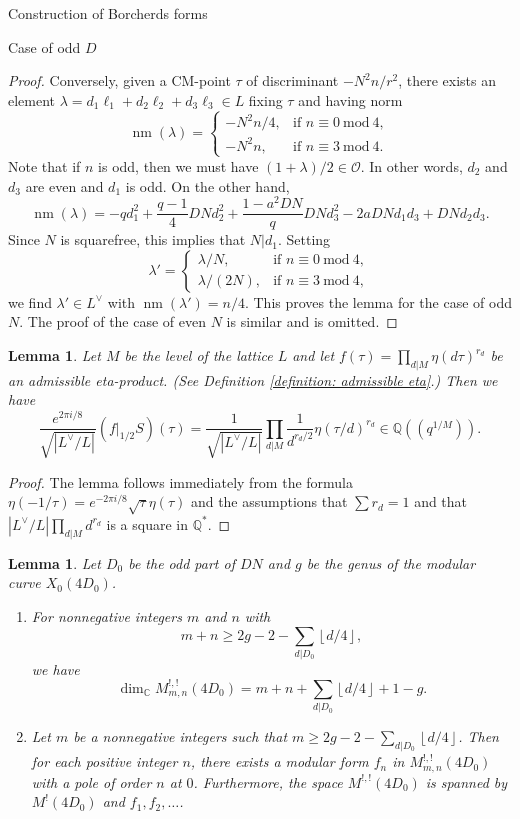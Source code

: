 \documentclass{amsart}
\newcounter{lemma}
\newtheorem{Lemma}[lemma]{Lemma}
\theoremstyle{definition}
\def\nm{\operatorname{nm}}
\def\C{\mathbb C}
\def\O{\mathcal O}
\def\Q{\mathbb Q}
\def\mod{\  \mathrm{mod}\ }
\def\gauss#1{\left\lfloor #1\right\rfloor}
\begin{document}
\begin{section}{Construction of Borcherds forms}
\begin{subsection}{Case of odd $D$}
\begin{proof}
  Conversely, given a CM-point $\tau$ of discriminant $-N^2n/r^2$,
  there exists an element $\lambda=d_1\ell_1+d_2\ell_2+d_3\ell_3\in L$
  fixing $\tau$ and having norm
  $$
    \nm(\lambda)=\begin{cases}
    -N^2n/4, &\text{if }n\equiv0\mod 4, \\
    -N^2n, &\text{if }n\equiv 3\mod 4. \end{cases}
  $$
  Note that if $n$ is odd, then we must have $(1+\lambda)/2\in\O$.
  In other words, $d_2$ and $d_3$ are even and $d_1$ is odd.
  On the other hand,
  $$
    \nm(\lambda)
  =-qd_1^2+\frac{q-1}4DNd_2^2+\frac{1-a^2DN}qDNd_3^2
   -2aDNd_1d_3+DNd_2d_3.
  $$
  Since $N$ is squarefree, this implies that $N|d_1$. Setting
  $$
    \lambda'=\begin{cases}\lambda/N, &\text{if }n\equiv 0\mod 4, \\
    \lambda/(2N), &\text{if }n\equiv 3\mod 4, \end{cases}
  $$
  we find $\lambda'\in L^\vee$ with $\nm(\lambda')=n/4$. This proves
  the lemma for the case of odd $N$. The proof of the case of even $N$
  is similar and is omitted.
\end{proof}

\begin{Lemma}\label{lemma: eta at 0}
  Let $M$ be the level of the lattice $L$ and let
  $f(\tau)=\prod_{d|M}\eta(d\tau)^{r_d}$ be an admissible eta-product.
  (See Definition \ref{definition: admissible eta}.) Then we have
  $$
    \frac{e^{2\pi i/8}}{\sqrt{|L^\vee/L|}}(f\big|_{1/2}S)(\tau)
   =\frac1{\sqrt{|L^\vee/L|}}\prod_{d|M}
    \frac1{d^{r_d/2}}\eta(\tau/d)^{r_d}\in\Q((q^{1/M})).
  $$
\end{Lemma}

\begin{proof} The lemma follows immediately from the formula
  $\eta(-1/\tau)=e^{-2\pi i/8}\sqrt\tau\eta(\tau)$ and the assumptions
  that $\sum r_d=1$ and that $|L^\vee/L|\prod_{d|M}d^{r_d}$ is a
  square in $\Q^\ast$.
\end{proof}

\begin{Lemma} \label{lemma: dimension 2}
  Let $D_0$ be the odd part of $DN$ and $g$ be the genus of the
  modular curve $X_0(4D_0)$.
  \begin{enumerate}
  \item For nonnegative integers $m$ and $n$ with
  $$
    m+n\ge 2g-2-\sum_{d|D_0}\gauss{d/4},
  $$
  we have
  $$
    \dim_\C M_{m,n}^{!,!}(4D_0)=m+n+\sum_{d|D_0}\gauss{d/4}+1-g.
  $$
  \item Let $m$ be a nonnegative integers such that
  $m\ge 2g-2-\sum_{d|D_0}\gauss{d/4}$. Then for each positive
  integer $n$, there exists a modular form $f_n$ in $M^{!,!}_{m,n}(4D_0)$
  with a pole of order $n$ at $0$. Furthermore, the space
  $M^{!,!}(4D_0)$ is spanned by $M^!(4D_0)$ and $f_1,f_2,\ldots$.
  \end{enumerate}
\end{Lemma}


\end{subsection}
\end{section}
\end{document}
